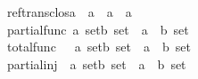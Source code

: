 \begin{isabellebody}
ref{\isacharunderscore}trans{\isacharunderscore}clos{\isacharcolon}{\isacharcolon}{\isachardoublequoteopen}{\isacharparenleft}{\isacharprime}a\ {\isacharless}{\isacharequal}{\isachargreater}\ {\isacharprime}a{\isacharparenright}\ {\isacharequal}{\isachargreater}\ {\isacharparenleft}{\isacharprime}a\ {\isacharless}{\isacharequal}{\isachargreater}\ {\isacharprime}a{\isacharparenright}\ {\isachardoublequoteclose}\ \ \ \ \ \ \ \ \ \ \ {\isacharparenleft}{\isachardoublequoteopen}{\isacharunderscore}\ {\isacharpercent}{\isacharasterisk}{\isachardoublequoteclose}\ \ \ \ \ {\isacharbrackleft}{}{}{}{}{\isacharbrackright}\ {}{}{}{\isacharparenright}\isanewline
\isanewline
partial{\isacharunderscore}func\ {\isacharcolon}{\isacharcolon}{\isachardoublequoteopen}{\isacharbrackleft}{\isacharprime}a\ set{\isacharcomma}{\isacharprime}b\ set{\isacharbrackright}\ {\isacharequal}{\isachargreater}\ {\isacharparenleft}{\isacharprime}a\ {\isacharless}{\isacharequal}{\isachargreater}\ {\isacharprime}b{\isacharparenright}\ set{\isachardoublequoteclose}\ \ \ \ \ {\isacharparenleft}{\isachardoublequoteopen}{\isacharunderscore}\ {\isacharminus}{\isacharbar}{\isacharminus}{\isachargreater}\ {\isacharunderscore}{\isachardoublequoteclose}\ \ \ {\isacharbrackleft}{}{}{\isacharcomma}{}{}{\isacharbrackright}\ {}{}{\isacharparenright}\isanewline
\isanewline
total{\isacharunderscore}func\ \ \ {\isacharcolon}{\isacharcolon}{\isachardoublequoteopen}{\isacharbrackleft}{\isacharprime}a\ set{\isacharcomma}{\isacharprime}b\ set{\isacharbrackright}\ {\isacharequal}{\isachargreater}\ {\isacharparenleft}{\isacharprime}a\ {\isacharless}{\isacharequal}{\isachargreater}\ {\isacharprime}b{\isacharparenright}\ set{\isachardoublequoteclose}\ \ \ \ \ {\isacharparenleft}{\isachardoublequoteopen}{\isacharunderscore}\ {\isacharminus}{\isacharminus}{\isacharminus}{\isachargreater}\ {\isacharunderscore}{\isachardoublequoteclose}\ \ \ {\isacharbrackleft}{}{}{\isacharcomma}{}{}{\isacharbrackright}\ {}{}{\isacharparenright}\isanewline
\isanewline
partial{\isacharunderscore}inj\ \ {\isacharcolon}{\isacharcolon}{\isachardoublequoteopen}{\isacharbrackleft}{\isacharprime}a\ set{\isacharcomma}{\isacharprime}b\ set{\isacharbrackright}\ {\isacharequal}{\isachargreater}\ {\isacharparenleft}{\isacharprime}a\ {\isacharless}{\isacharequal}{\isachargreater}\ {\isacharprime}b{\isacharparenright}\ set{\isachardoublequoteclose}\ \ \ \ \ {\isacharparenleft}{\isachardoublequoteopen}{\isacharunderscore}\ {\isachargreater}{\isacharminus}{\isacharbar}{\isacharminus}{\isachargreater}\ {\isacharunderscore}{\isachardoublequoteclose}\ \ {\isacharbrackleft}{}{}{\isacharcomma}{}{}{\isacharbrackright}\ {}{}{\isacharparenright}\isanewline

\end{isabellebody}
